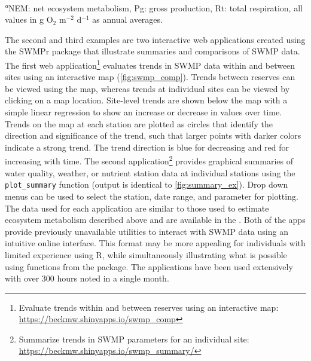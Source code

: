 \documentclass[10pt,letterpaper]{article}\usepackage[]{graphicx}\usepackage[]{color}
\begin{document}
\begin{table}[!tbp]
\footnotesize{\textsuperscript{{\it a}}NEM: net ecosystem metabolism, Pg: gross production, Rt: total respiration, all values in g O$_2$ m$^{-2}$ d$^{-1}$ as annual averages.}\end{table}


The second and third examples are two interactive web applications \cite{Chang15} created using the SWMPr package that illustrate summaries and comparisons of \ac{SWMP} data.  The first web application\footnote{Evaluate trends within and between reserves using an interactive map: \href{https://beckmw.shinyapps.io/swmp_comp}{https://beckmw.shinyapps.io/swmp\_comp}} evaluates trends in \ac{SWMP} data within and between sites using an interactive map (\cref{fig:swmp_comp}).  Trends between reserves can be viewed using the map, whereas trends at individual sites can be viewed by clicking on a map location.  Site-level trends are shown below the map with a simple linear regression to show an increase or decrease in values over time.  Trends on the map at each station are plotted as circles that identify the direction and significance of the trend, such that larger points with darker colors indicate a strong trend.  The trend direction is blue for decreasing and red for increasing with time.  The second application\footnote{Summarize trends in \ac{SWMP} parameters for an individual site: \href{https://beckmw.shinyapps.io/swmp_summary/}{https://beckmw.shinyapps.io/swmp\_summary/}} provides graphical summaries of water quality, weather, or nutrient station data at individual stations using the \texttt{plot\_summary} function (output is identical to \cref{fig:summary_ex}). Drop down menus can be used to select the station, date range, and parameter for plotting. The data used for each application are similar to those used to estimate ecosystem metabolism described above and are available in the .  Both of the apps provide previously unavailable utilities to interact with \ac{SWMP} data using an intuitive online interface.  This format may be more appealing for individuals with limited experience using R, while simultaneously illustrating what is possible using functions from the package. The applications have been used extensively with over 300 hours noted in a single month.   
\end{document}
